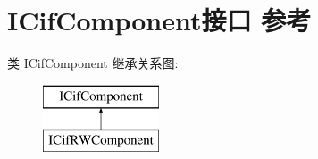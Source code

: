 \hypertarget{interface_i_cif_component}{}\section{I\+Cif\+Component接口 参考}
\label{interface_i_cif_component}
类 I\+Cif\+Component 继承关系图\+:\begin{figure}[H]
\begin{center}
\leavevmode
\includegraphics[height=2.000000cm]{interface_i_cif_component}
\end{center}
\end{figure}
